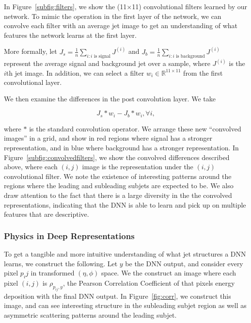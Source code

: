 In Figure~\ref{subfig:filters}, we show the (11$\times$11) convolutional filters learned by our network. To mimic the operation in the first layer of the network, we can convolve each filter with an average jet image to get an understanding of what features the network learns at the first layer. 

More formally, let $J_s=\frac{1}{n}\sum_{i:i\text{ is signal}} J^{(i)}$ and $J_b=\frac{1}{n}\sum_{i:i\text{ is background}}J^{(i)}$ represent the average signal and background jet over a sample, where $J^{(i)}$ is the $i$th jet image. In addition, we can select a filter $w_i\in\mathbb{R}^{11\times11}$ from the first convolutional layer.

We then examine the differences in the post convolution layer. We take 

\begin{equation}
  J_s \ast w_i - J_b \ast w_i, \forall i,
\end{equation}

where $\ast$ is the standard convolution operator. We arrange these new ``convolved images'' in a grid, and show in red regions where signal has a stronger representation, and in blue where background has a stronger representation. In Figure~\ref{subfig:convolvedfilters}, we show the convolved differences described above, where each $(i, j)$ image is the representation under the $(i, j)$ convolutional filter. We note the existence of interesting patterns around the regions where the leading and subleading subjets are expected to be. We also draw attention to the fact that there is a large diversity in the the convolved representations, indicating that the DNN is able to learn and pick up on multiple features that are descriptive.



\subsubsection{Physics in Deep Representations} %
\label{ssub:physics_in_deep_representations}

To get a tangible and more intuitive understanding of what jet structures a DNN learns, we construct the following. Let $y$ be the DNN output, and consider every pixel $p_ij$ in transformed $(\eta, \phi)$ space. We the construct an image where each pixel $(i, j)$ is $\rho_{p_{ij}, y}$, the Pearson Correlation Coefficient of that pixels energy deposition with the final DNN output. In Figure~\ref{fig:corr}, we construct this image, and can see interesting structure in the subleading subjet region as well as asymmetric scattering patterns around the leading subjet.




